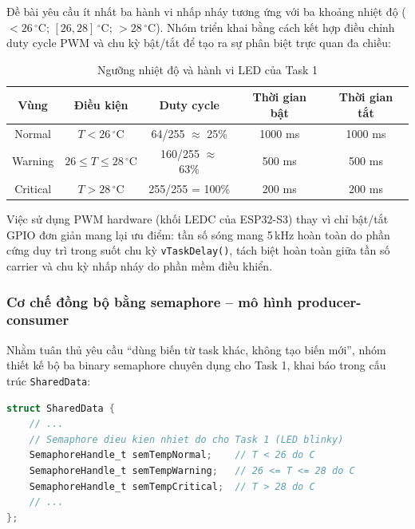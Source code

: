 Đề bài yêu cầu ít nhất ba hành vi nhấp nháy tương ứng với ba khoảng nhiệt độ ($< 26\,^\circ\mathrm{C}$; $[26, 28]\,^\circ\mathrm{C}$; $> 28\,^\circ\mathrm{C}$). Nhóm triển khai bằng cách kết hợp điều chỉnh duty cycle PWM và chu kỳ bật/tắt để tạo ra sự phân biệt trực quan đa chiều:

\begin{table}[h!]
\centering
\caption{Ngưỡng nhiệt độ và hành vi LED của Task 1}
\label{tab:task1-thresholds}
\begin{tabular}{|c|c|c|c|c|}
\hline
\textbf{Vùng} & \textbf{Điều kiện} & \textbf{Duty cycle} & \textbf{Thời gian bật} & \textbf{Thời gian tắt} \\
\hline
Normal   & $T < 26\,^\circ\mathrm{C}$              & 64/255 $\approx$ 25\% & 1000 ms & 1000 ms \\
\hline
Warning  & $26 \leq T \leq 28\,^\circ\mathrm{C}$  & 160/255 $\approx$ 63\% & 500 ms & 500 ms \\
\hline
Critical & $T > 28\,^\circ\mathrm{C}$              & 255/255 = 100\%        & 200 ms & 200 ms \\
\hline
\end{tabular}
\end{table}

Việc sử dụng PWM hardware (khối LEDC của ESP32-S3) thay vì chỉ bật/tắt GPIO đơn giản mang lại ưu điểm: tần số sóng mang 5\,kHz hoàn toàn do phần cứng duy trì trong suốt chu kỳ \texttt{vTaskDelay()}, tách biệt hoàn toàn giữa tần số carrier và chu kỳ nhấp nháy do phần mềm điều khiển.

\subsubsection*{Cơ chế đồng bộ bằng semaphore -- mô hình producer-consumer}

Nhằm tuân thủ yêu cầu ``dùng biến từ task khác, không tạo biến mới'', nhóm thiết kế bộ ba binary semaphore chuyên dụng cho Task 1, khai báo trong cấu trúc \texttt{SharedData}:

\begin{lstlisting}[language=c, caption=Các semaphore dành riêng cho Task 1 (trích global.h)]
struct SharedData {
    // ...
    // Semaphore dieu kien nhiet do cho Task 1 (LED blinky)
    SemaphoreHandle_t semTempNormal;    // T < 26 do C
    SemaphoreHandle_t semTempWarning;   // 26 <= T <= 28 do C
    SemaphoreHandle_t semTempCritical;  // T > 28 do C
    // ...
};
\end{lstlisting}

